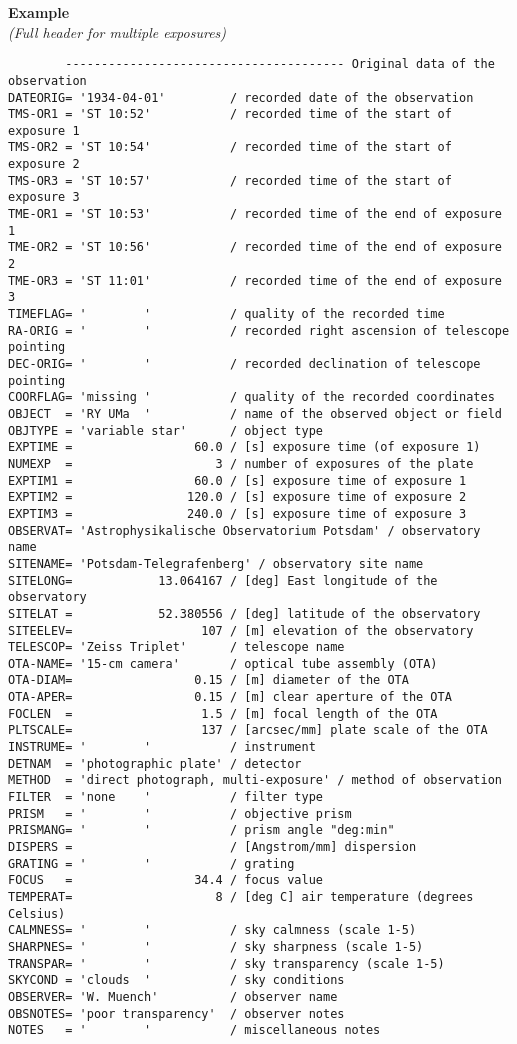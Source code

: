 \documentclass[11pt]{ivoa}
\newenvironment{fitsexample}[1]
{\bigskip\noindent\textbf{Example}\\\textit{(#1)\smallskip}}
{\medskip}
\begin{document}
\begin{fitsexample}{Full header for multiple exposures}
\begin{lstlisting}
        --------------------------------------- Original data of the observation
DATEORIG= '1934-04-01'         / recorded date of the observation
TMS-OR1 = 'ST 10:52'           / recorded time of the start of exposure 1
TMS-OR2 = 'ST 10:54'           / recorded time of the start of exposure 2
TMS-OR3 = 'ST 10:57'           / recorded time of the start of exposure 3
TME-OR1 = 'ST 10:53'           / recorded time of the end of exposure 1
TME-OR2 = 'ST 10:56'           / recorded time of the end of exposure 2
TME-OR3 = 'ST 11:01'           / recorded time of the end of exposure 3
TIMEFLAG= '        '           / quality of the recorded time
RA-ORIG = '        '           / recorded right ascension of telescope pointing
DEC-ORIG= '        '           / recorded declination of telescope pointing
COORFLAG= 'missing '           / quality of the recorded coordinates
OBJECT  = 'RY UMa  '           / name of the observed object or field
OBJTYPE = 'variable star'      / object type
EXPTIME =                 60.0 / [s] exposure time (of exposure 1)
NUMEXP  =                    3 / number of exposures of the plate
EXPTIM1 =                 60.0 / [s] exposure time of exposure 1
EXPTIM2 =                120.0 / [s] exposure time of exposure 2
EXPTIM3 =                240.0 / [s] exposure time of exposure 3
OBSERVAT= 'Astrophysikalische Observatorium Potsdam' / observatory name
SITENAME= 'Potsdam-Telegrafenberg' / observatory site name
SITELONG=            13.064167 / [deg] East longitude of the observatory
SITELAT =            52.380556 / [deg] latitude of the observatory
SITEELEV=                  107 / [m] elevation of the observatory
TELESCOP= 'Zeiss Triplet'      / telescope name
OTA-NAME= '15-cm camera'       / optical tube assembly (OTA)
OTA-DIAM=                 0.15 / [m] diameter of the OTA
OTA-APER=                 0.15 / [m] clear aperture of the OTA
FOCLEN  =                  1.5 / [m] focal length of the OTA
PLTSCALE=                  137 / [arcsec/mm] plate scale of the OTA
INSTRUME= '        '           / instrument
DETNAM  = 'photographic plate' / detector
METHOD  = 'direct photograph, multi-exposure' / method of observation
FILTER  = 'none    '           / filter type
PRISM   = '        '           / objective prism
PRISMANG= '        '           / prism angle "deg:min"
DISPERS =                      / [Angstrom/mm] dispersion
GRATING = '        '           / grating
FOCUS   =                 34.4 / focus value
TEMPERAT=                    8 / [deg C] air temperature (degrees Celsius)
CALMNESS= '        '           / sky calmness (scale 1-5)
SHARPNES= '        '           / sky sharpness (scale 1-5)
TRANSPAR= '        '           / sky transparency (scale 1-5)
SKYCOND = 'clouds  '           / sky conditions
OBSERVER= 'W. Muench'          / observer name
OBSNOTES= 'poor transparency'  / observer notes
NOTES   = '        '           / miscellaneous notes
\end{lstlisting}
\end{fitsexample}
\end{document}
